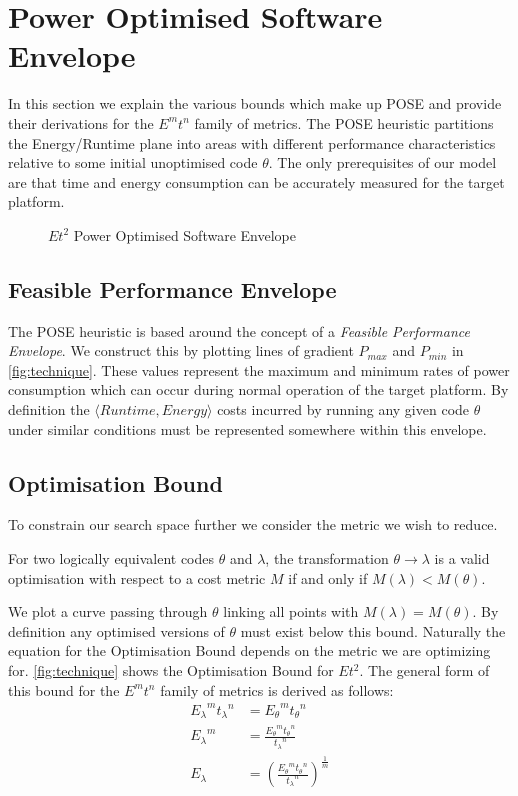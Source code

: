 \section{Power Optimised Software Envelope}
\label{sec:pose}
In this section we explain the various bounds which make up POSE and provide their derivations for the $E^mt^n$ family of metrics.
The POSE heuristic partitions the Energy/Runtime plane into areas with different performance characteristics relative to some initial unoptimised code $\theta$.
The only prerequisites of our model are that time and energy consumption can be accurately measured for the target platform.

\begin{figure}
\centering

\caption{$Et^2$ Power Optimised Software Envelope}
\label{fig:technique}
\end{figure}

\subsection{Feasible Performance Envelope}
The POSE heuristic is based around the concept of a \emph{Feasible Performance Envelope}.
We construct this by plotting lines of gradient $P_{max}$ and $P_{min}$ in \autoref{fig:technique}.
These values represent the maximum and minimum rates of power consumption which can occur during normal operation of the target platform.
By definition the $\langle Runtime, Energy\rangle$ costs incurred by running any given code $\theta$ under similar conditions must be represented somewhere within this envelope.

\subsection{Optimisation Bound}
To constrain our search space further we consider the metric we wish to reduce.

\begin{definition}
For two logically equivalent codes $\theta$ and $\lambda$, the transformation ${\theta \to \lambda}$ is a valid optimisation with respect to a cost metric $M$ if and only if ${M(\lambda) < M(\theta)}$.
\end{definition}

We plot a curve passing through $\theta$ linking all points with ${M(\lambda) = M(\theta)}$. By definition any optimised versions of $\theta$ must exist below this bound.
Naturally the equation for the Optimisation Bound depends on the metric we are optimizing for.
\autoref{fig:technique} shows the Optimisation Bound for $Et^2$.
The general form of this bound for the $E^mt^n$ family of metrics is derived as follows:
\begin{align}
 {E_\lambda}^m{t_\lambda}^n &= {E_\theta}^m{t_\theta}^n \nonumber \\
 {E_\lambda}^m &= \frac{{E_\theta}^m{t_\theta}^n}{{t_\lambda}^n} \nonumber \\
  E_\lambda &= (\frac{{E_\theta}^m{t_\theta}^n}{{t_\lambda}^n})^\frac{1}{m}
\label{eq:optimisation}
\end{align}

